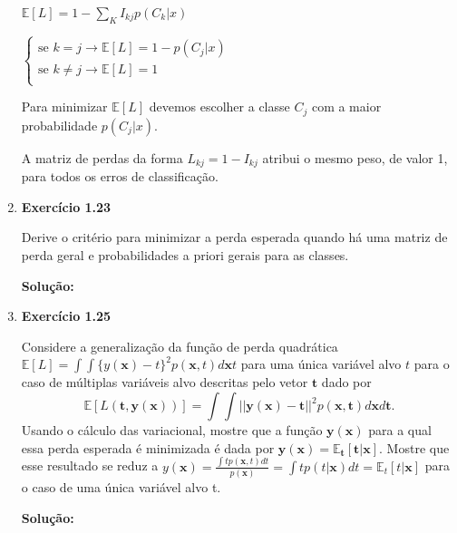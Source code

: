 \begin{enumerate}
$\mathbb{E}[L]=1 - \sum_{K}I_{kj}p(C_k | x)$

$\begin{cases}
    \text{se }k=j \rightarrow \mathbb{E}[L]=1 - p(C_j | x)\\
    \text{se }k\neq j \rightarrow \mathbb{E}[L]=1 \\
\end{cases}$


Para minimizar $\mathbb{E}[L]$ devemos escolher a classe $C_j$ com a maior probabilidade $p(C_j|x)$.

A matriz de perdas da forma $L_{kj} = 1 - I_{kj}$ atribui o mesmo peso, de valor 1, para todos os erros de classificação.\\

\item \textbf{Exercício 1.23} \par

Derive o critério para minimizar a perda esperada quando há uma matriz de perda geral e probabilidades a priori gerais para as classes.

\newline \par
\textbf{Solução:}

\item \textbf{Exercício 1.25} \par

Considere a generalização da função de perda quadrática $\mathbb{E}[L] = \int \int \{y(\boldsymbol{x})-t\}^2p(\boldsymbol{x},t)d\boldsymbol{x}t$ para uma única variável alvo $t$ para o caso de múltiplas variáveis alvo descritas pelo vetor $\boldsymbol{t}$ dado por
\begin{equation*}
    \mathbb{E}[L(\boldsymbol{t},\boldsymbol{y}(\boldsymbol{x}))] = \int \int ||\boldsymbol{y}(\boldsymbol{x})-\boldsymbol{t}||^2p(\boldsymbol{x},\boldsymbol{t})d\boldsymbol{x}d\boldsymbol{t}.
\end{equation*}
Usando o cálculo das variacional, mostre que a função $\boldsymbol{y}(\boldsymbol{x})$ para a qual essa perda esperada é minimizada é dada por $\boldsymbol{y}(\boldsymbol{x}) = \mathbb{E}_{\boldsymbol{t}}[\boldsymbol{t}|\boldsymbol{x}]$. Mostre que esse resultado se reduz a $y(\boldsymbol{x}) = \frac{\int tp(\boldsymbol{x},t)dt}{p(\boldsymbol{x})} = \int tp(t|\boldsymbol{x}) dt = \mathbb{E}_t[t|\boldsymbol{x}]$ para o caso de uma única variável alvo t.
\newline \par
\textbf{Solução:}


\end{enumerate}
